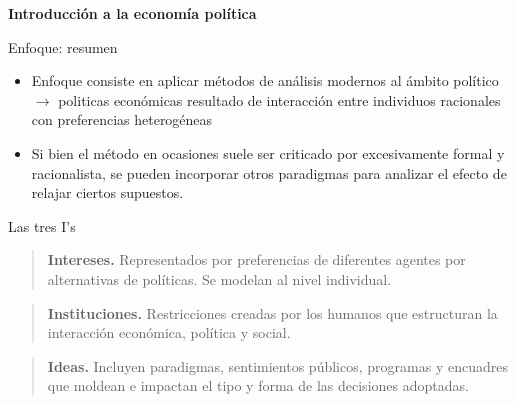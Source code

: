 \documentclass[
  ignorenonframetext,
]{beamer}
\providecommand{\tightlist}{%
  \setlength{\itemsep}{0pt}\setlength{\parskip}{0pt}}\usepackage{longtable,booktabs,array}
\begin{document}
\begin{frame}{\textbf{Introducción a la economía política}}
\begin{block}{Enfoque: resumen}
\protect\hypertarget{enfoque-resumen}{}
\begin{itemize}
\tightlist
\item
  Enfoque consiste en aplicar métodos de análisis modernos al ámbito
  político \(\longrightarrow\) politicas económicas resultado de
  interacción entre individuos racionales con preferencias heterogéneas
\item
  Si bien el método en ocasiones suele ser criticado por excesivamente
  formal y racionalista, se pueden incorporar otros paradigmas para
  analizar el efecto de relajar ciertos supuestos.
\end{itemize}
\end{block}

\begin{block}{Las tres I's}
\protect\hypertarget{las-tres-is}{}
\begin{quote}
\textbf{Intereses.} Representados por preferencias de diferentes agentes
por alternativas de políticas. Se modelan al nivel individual.
\end{quote}

\begin{quote}
\textbf{Instituciones.} Restricciones creadas por los humanos que
estructuran la interacción económica, política y social.
\end{quote}

\begin{quote}
\textbf{Ideas.} Incluyen paradigmas, sentimientos públicos, programas y
encuadres que moldean e impactan el tipo y forma de las decisiones
adoptadas.
\end{quote}
\end{block}
\end{frame}
\end{document}
